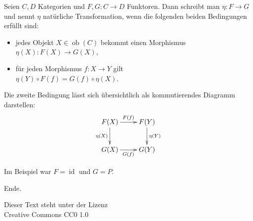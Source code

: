\documentclass{beamer}
\newcommand{\modest}[1]{{\small\color{gray}#1}}
\newcommand{\id}{\operatorname{id}}
\newcommand{\ob}{\operatorname{ob}}
\begin{document}
\begin{frame}
Seien $C,D$ Kategorien und $F,G\colon C\to D$ Funktoren. Dann schreibt
man $\eta\colon F\to G$ und nennt $\eta$ natürliche Transformation,
wenn die folgenden beiden Bedingungen erfüllt sind:
\begin{itemize}
\item jedes Objekt $X\in\ob(C)$ bekommt einen Morphismus\\
  $\eta(X)\colon F(X)\to G(X)$,
\item für jeden Morphismus $f\colon X\to Y$ gilt\\
  $\eta(Y)\circ F(f) = G(f)\circ\eta(X)$.
\end{itemize}
\end{frame}

\begin{frame}
Die zweite Bedingung lässt sich übersichtlich als kommutierendes
Diagramm darstellen:
\[\xymatrix{
F(X) \ar[r]^{F(f)} \ar[d]_{\eta(X)} & F(Y) \ar[d]^{\eta(Y)} \\
G(X) \ar[r]_{G(f)} & G(Y)}\]
\end{frame}

\begin{frame}
Im Beispiel war $F=\id$ und $G=P$.
\end{frame}

\begin{frame}
Ende.

\vfill
\modest{Dieser Text steht unter der Lizenz\\
Creative Commons CC0 1.0}
\end{frame}
\end{document}

